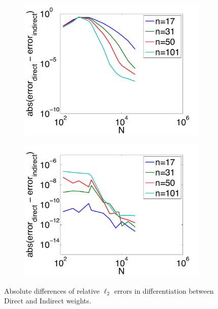 \begin{figure}[htbp]
	\centering
	\begin{subfigure}[b]{0.425\textwidth}
	\includegraphics[width=1.0\textwidth]{figures/chapter2/compare_weight_generation/lsfc_vs_px_grad_dot_px_grad/abs_diff_of_rel_l2_errors.pdf}
		\end{subfigure}
	\begin{subfigure}[b]{0.425\textwidth}
	\includegraphics[width=1.0\textwidth]{figures/chapter2/compare_weight_generation/xsfc_vs_xsfc_alt_on_sph32_times_sine_20x/abs_diff_of_rel_l2_errors.pdf}
	\end{subfigure}
		\caption{Absolute differences of relative $\ell_{2}$ errors in differentiation between Direct and Indirect weights.}
\end{figure}

